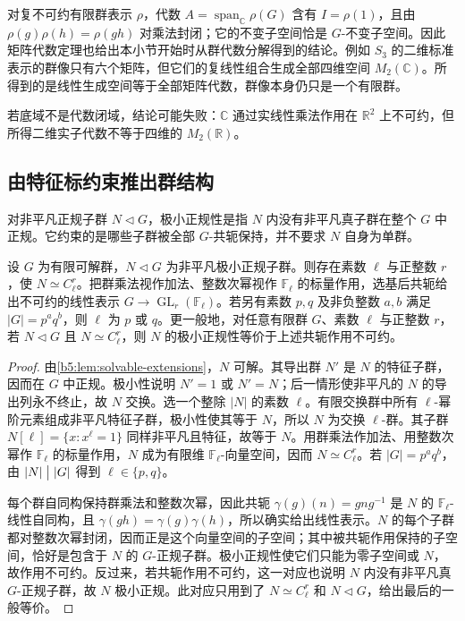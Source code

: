 对复不可约有限群表示 \(\rho\)，代数 \(A=\operatorname{span}_{\mathbb C}\rho(G)\) 含有 \(I=\rho(1)\)，且由 \(\rho(g)\rho(h)=\rho(gh)\) 对乘法封闭；它的不变子空间恰是 \(G\)-不变子空间。因此矩阵代数定理也给出本小节开始时从群代数分解得到的结论。例如 \(S_3\) 的二维标准表示的群像只有六个矩阵，但它们的复线性组合生成全部四维空间 \(M_2(\mathbb C)\)。所得到的是线性生成空间等于全部矩阵代数，群像本身仍只是一个有限群。

\ProseParagraphBreak
若底域不是代数闭域，结论可能失败：\(\mathbb C\) 通过实线性乘法作用在 \(\mathbb R^2\) 上不可约，但所得二维实子代数不等于四维的 \(M_2(\mathbb R)\)。

\subsection{由特征标约束推出群结构}
\label{b5:subsec:0506:03}

对非平凡正规子群 \(N\triangleleft G\)，极小正规性是指 \(N\) 内没有非平凡真子群在整个 \(G\) 中正规。它约束的是哪些子群被全部 \(G\)-共轭保持，并不要求 \(N\) 自身为单群。

\begin{proposition}\label{b5:prop:minimal-normal-solvable}
	设 \(G\) 为有限可解群，\(N\triangleleft G\) 为非平凡极小正规子群。则存在素数 \(\ell\) 与正整数 \(r\)，使 \(N\simeq C_\ell^r\)。把群乘法视作加法、整数次幂视作 \(\mathbb F_\ell\) 的标量作用，选基后共轭给出不可约的线性表示 \(G\rightarrow\operatorname{GL}_r(\mathbb F_\ell)\)。若另有素数 \(p,q\) 及非负整数 \(a,b\) 满足 \(|G|=p^a q^b\)，则 \(\ell\) 为 \(p\) 或 \(q\)。更一般地，对任意有限群 \(G\)、素数 \(\ell\) 与正整数 \(r\)，若 \(N\triangleleft G\) 且 \(N\simeq C_\ell^r\)，则 \(N\) 的极小正规性等价于上述共轭作用不可约。
\end{proposition}
\begin{proof}
	由\cref{b5:lem:solvable-extensions}，\(N\) 可解。其导出群 \(N'\) 是 \(N\) 的特征子群，因而在 \(G\) 中正规。极小性说明 \(N'=1\) 或 \(N'=N\)；后一情形使非平凡的 \(N\) 的导出列永不终止，故 \(N\) 交换。选一个整除 \(|N|\) 的素数 \(\ell\)。有限交换群中所有 \(\ell\)-幂阶元素组成非平凡特征子群，极小性使其等于 \(N\)，所以 \(N\) 为交换 \(\ell\)-群。其子群 \(N[\ell]=\{x:x^\ell=1\}\) 同样非平凡且特征，故等于 \(N\)。用群乘法作加法、用整数次幂作 \(\mathbb F_\ell\) 的标量作用，\(N\) 成为有限维 \(\mathbb F_\ell\)-向量空间，因而 \(N\simeq C_\ell^r\)。若 \(|G|=p^aq^b\)，由 \(|N|\bigm\vert |G|\) 得到 \(\ell\in\{p,q\}\)。

	每个群自同构保持群乘法和整数次幂，因此共轭 \(\gamma(g)(n)=gng^{-1}\) 是 \(N\) 的 \(\mathbb F_\ell\)-线性自同构，且 \(\gamma(gh)=\gamma(g)\gamma(h)\)，所以确实给出线性表示。\(N\) 的每个子群都对整数次幂封闭，因而正是这个向量空间的子空间；其中被共轭作用保持的子空间，恰好是包含于 \(N\) 的 \(G\)-正规子群。极小正规性使它们只能为零子空间或 \(N\)，故作用不可约。反过来，若共轭作用不可约，这一对应也说明 \(N\) 内没有非平凡真 \(G\)-正规子群，故 \(N\) 极小正规。此对应只用到了 \(N\simeq C_\ell^r\) 和 \(N\triangleleft G\)，给出最后的一般等价。
\end{proof}

